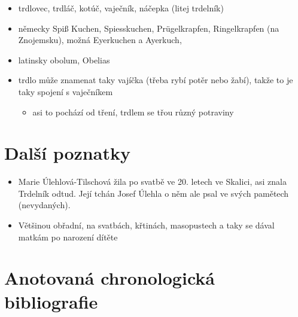 \begin{itemize}
\tightlist
\item
  trdlovec, trdláč, kotúč, vaječník, náčepka (litej trdelník)
\item
  německy Spiß Kuchen, Spiesskuchen, Prügelkrapfen, Ringelkrapfen (na
  Znojemsku), možná Eyerkuchen a Ayerkuch,
\item
  latinsky obolum, Obelias
\item
  trdlo může znamenat taky vajíčka (třeba rybí potěr nebo žabí), takže
  to je taky spojení s vaječníkem

  \begin{itemize}
  \tightlist
  \item
    asi to pochází od tření, trdlem se třou různý potraviny
  \end{itemize}
\end{itemize}

\section{Další poznatky}\label{Dalux161uxedux20poznatky}

\begin{itemize}
\tightlist
\item
  Marie Úlehlová-Tilschová žila po svatbě ve 20. letech ve Skalici, asi
  znala Trdelník odtud. Její tchán Josef Úlehla o něm ale psal ve svých
  pamětech (nevydaných).
\end{itemize}

\begin{itemize}
\tightlist
\item
  Většinou obřadní, na svatbách, křtinách, masopustech a taky se dával
  matkám po narození dítěte
\end{itemize}

\section{Anotovaná chronologická
bibliografie}\label{Anotovanuxe1ux20chronologickuxe1ux20bibliografie}

